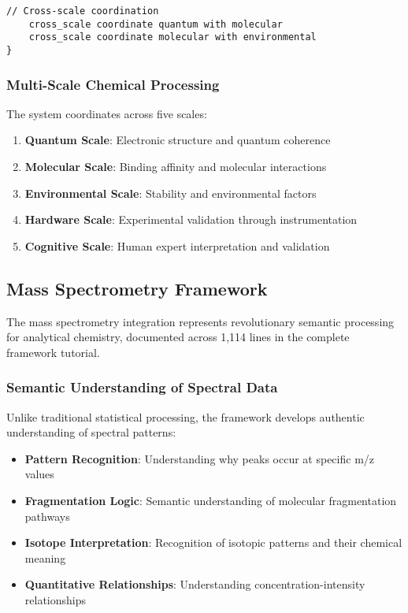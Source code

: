 \documentclass[12pt,a4paper,twoside]{article}
\begin{document}
\begin{itemize}
\begin{lstlisting}[caption=Cheminformatics BMD Operations]
    // Cross-scale coordination
    cross_scale coordinate quantum with molecular
    cross_scale coordinate molecular with environmental
}
\end{lstlisting}

\subsubsection{Multi-Scale Chemical Processing}

The system coordinates across five scales:
\begin{enumerate}
\item \textbf{Quantum Scale}: Electronic structure and quantum coherence
\item \textbf{Molecular Scale}: Binding affinity and molecular interactions
\item \textbf{Environmental Scale}: Stability and environmental factors
\item \textbf{Hardware Scale}: Experimental validation through instrumentation
\item \textbf{Cognitive Scale}: Human expert interpretation and validation
\end{enumerate}

\subsection{Mass Spectrometry Framework}

The mass spectrometry integration represents revolutionary semantic processing for analytical chemistry, documented across 1,114 lines in the complete framework tutorial.

\subsubsection{Semantic Understanding of Spectral Data}

Unlike traditional statistical processing, the framework develops authentic understanding of spectral patterns:

\begin{itemize}
\item \textbf{Pattern Recognition}: Understanding why peaks occur at specific m/z values
\item \textbf{Fragmentation Logic}: Semantic understanding of molecular fragmentation pathways
\item \textbf{Isotope Interpretation}: Recognition of isotopic patterns and their chemical meaning
\item \textbf{Quantitative Relationships}: Understanding concentration-intensity relationships
\end{itemize}


\end{itemize}
\end{document}
